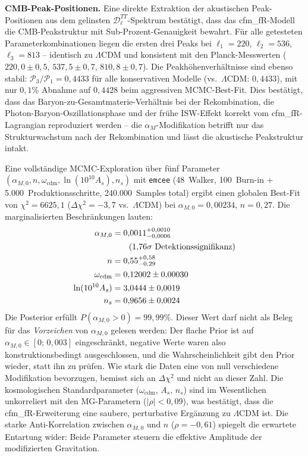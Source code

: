 \documentclass[11pt,a4paper]{article}
\begin{document}
\textbf{CMB-Peak-Positionen.} Eine direkte Extraktion der akustischen Peak-Positionen aus dem gelinsten $\mathcal{D}_\ell^{TT}$-Spektrum best\"atigt, dass das cfm\_fR-Modell die CMB-Peakstruktur mit Sub-Prozent-Genauigkeit bewahrt. F\"ur alle getesteten Parameterkombinationen liegen die ersten drei Peaks bei $\ell_1 = 220$, $\ell_2 = 536$, $\ell_3 = 813$ -- identisch zu $\Lambda$CDM und konsistent mit den Planck-Messwerten ($220{,}0 \pm 0{,}5$, $537{,}5 \pm 0{,}7$, $810{,}8 \pm 0{,}7$). Die Peakh\"ohenverh\"altnisse sind ebenso stabil: $\mathcal{P}_3/\mathcal{P}_1 = 0{,}4433$ f\"ur alle konservativen Modelle (vs.\ $\Lambda$CDM: $0{,}4433$), mit nur $0{,}1\%$ Abnahme auf $0{,}4428$ beim aggressiven MCMC-Best-Fit. Dies best\"atigt, dass das Baryon-zu-Gesamtmaterie-Verh\"altnis bei der Rekombination, die Photon-Baryon-Oszillationsphase und der fr\"uhe ISW-Effekt korrekt vom cfm\_fR-Lagrangian reproduziert werden -- die $\alpha_M$-Modifikation betrifft nur das Strukturwachstum nach der Rekombination und l\"asst die akustische Peakstruktur intakt.

Eine vollst\"andige MCMC-Exploration \"uber f\"unf Parameter $(\alpha_{M,0}, n, \omega_{\mathrm{cdm}}, \ln(10^{10}A_s), n_s)$ mit \texttt{emcee} (48~Walker, 100~Burn-in + 5.000~Produktionsschritte, 240.000~Samples total) ergibt einen globalen Best-Fit von $\chi^2 = 6625{,}1$ ($\Delta\chi^2 = -3{,}7$ vs.\ $\Lambda$CDM) bei $\alpha_{M,0} = 0{,}00234$, $n = 0{,}27$. Die marginalisierten Beschr\"ankungen lauten:
\begin{align}
\alpha_{M,0} &= 0{,}0011^{+0{,}0010}_{-0{,}0006} \notag \\
&\qquad (1{,}76\sigma \text{ Detektionssignifikanz}) \notag \\
n &= 0{,}55^{+0{,}58}_{-0{,}29} \notag \\
\omega_{\mathrm{cdm}} &= 0{,}12002 \pm 0{,}00030 \notag \\
\ln(10^{10}A_s) &= 3{,}0444 \pm 0{,}0019 \notag \\
n_s &= 0{,}9656 \pm 0{,}0024 \notag
\end{align}
Die Posterior erf\"ullt $P(\alpha_{M,0} > 0) = 99{,}99\%$. Dieser Wert darf nicht als Beleg f\"ur das \textit{Vorzeichen} von $\alpha_{M,0}$ gelesen werden: Der flache Prior ist auf $\alpha_{M,0} \in [0;\,0{,}003]$ eingeschr\"ankt, negative Werte waren also konstruktionsbedingt ausgeschlossen, und die Wahrscheinlichkeit gibt den Prior wieder, statt ihn zu pr\"ufen. Wie stark die Daten eine von null verschiedene Modifikation bevorzugen, bemisst sich an $\Delta\chi^2$ und nicht an dieser Zahl. Die kosmologischen Standardparameter ($\omega_{\mathrm{cdm}}$, $A_s$, $n_s$) sind im Wesentlichen unkorreliert mit den MG-Parametern ($|\rho| < 0{,}09$), was best\"atigt, dass die cfm\_fR-Erweiterung eine saubere, perturbative Erg\"anzung zu $\Lambda$CDM ist. Die starke Anti-Korrelation zwischen $\alpha_{M,0}$ und $n$ ($\rho = -0{,}61$) spiegelt die erwartete Entartung wider: Beide Parameter steuern die effektive Amplitude der modifizierten Gravitation.
\end{document}
